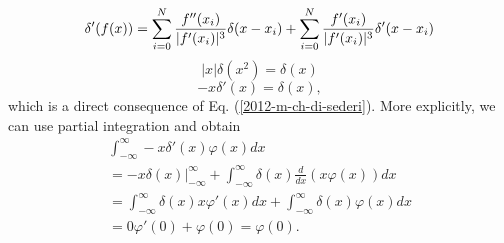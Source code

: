 \begin{equation}
 \delta '(f(x))=
\sum_{i=0}^N
{f'' (x_i)\over \vert f'(x_i)\vert ^3}
\delta (x-x_i) +
\sum_{i=0}^N
{f' (x_i)\over \vert f'(x_i)\vert ^3}
\delta ' (x-x_i)
 \end{equation}
 \begin{equation}
 \vert x\vert \delta (x^2)=\delta (x)
 \end{equation}
 \begin{equation}
 -x\delta '(x)=\delta (x),
 \end{equation}
which is a direct consequence of Eq. (\ref{2012-m-ch-di-sederi}).
{\color{OliveGreen}
\bproof
More explicitly, we can use partial integration and obtain
 \begin{equation}
 \begin{split}
\int _{-\infty}^\infty -x \delta' (x)  \varphi (x)  dx  \\
 =  - \left. x \delta (x)\right|_{-\infty}^\infty  + \int _{-\infty}^\infty \delta (x)
\frac{d}{dx}\left(x \varphi (x)\right)dx\\
 =
\int _{-\infty}^\infty \delta (x)
x \varphi' (x)  dx
+
\int _{-\infty}^\infty \delta (x)
\varphi (x) dx\\
 =
0 \varphi' (0)  +
\varphi (0)= \varphi (0).
 \end{split}
 \end{equation}
\eproof
}

